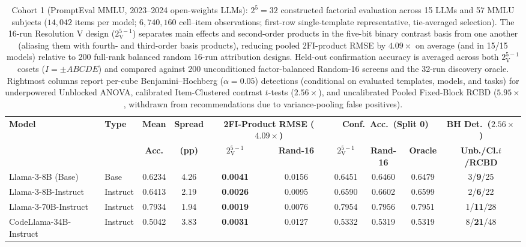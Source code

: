 \begin{table}[!ht]
\centering
\scriptsize
\setlength{\tabcolsep}{0.5pt}
\caption{Cohort 1 (PromptEval MMLU, 2023--2024 open-weights LLMs): $2^5=32$ constructed factorial evaluation across 15 LLMs and 57 MMLU subjects ($14{,}042$ items per model; $6{,}740{,}160$ cell--item observations; first-row single-template representative, tie-averaged selection). The 16-run Resolution V design ($2^{5-1}_{\mathrm{V}}$) separates main effects and second-order products in the five-bit binary contrast basis from one another (aliasing them with fourth- and third-order basis products), reducing pooled $2\mathrm{FI}$-product RMSE by $4.09\times$ on average (and in 15/15 models) relative to 200 full-rank balanced random 16-run attribution designs. Held-out confirmation accuracy is averaged across both $2^{5-1}_{\mathrm{V}}$ cosets ($I=\pm ABCDE$) and compared against 200 unconditioned factor-balanced Random-16 screens and the 32-run discovery oracle. Rightmost columns report per-cube Benjamini--Hochberg ($\alpha=0.05$) detections (conditional on evaluated templates, models, and tasks) for underpowered Unblocked ANOVA, calibrated Item-Clustered contrast $t$-tests (\textbf{$2.56\times$}), and uncalibrated Pooled Fixed-Block RCBD ($5.95\times$, withdrawn from recommendations due to variance-pooling false positives).}
\label{tab:mmlu_models}
\begin{tabular*}{\textwidth}{@{\extracolsep{\fill}}llcccccccc@{}}
\toprule
\textbf{Model} & \textbf{Type} & \textbf{Mean} & \textbf{Spread} & \multicolumn{2}{c}{\textbf{2FI-Product RMSE ($4.09\times$)}} & \multicolumn{3}{c}{\textbf{Conf.\ Acc.\ (Split 0)}} & \textbf{BH Det.\ ($2.56\times$)} \\
\cmidrule(lr){5-6} \cmidrule(lr){7-9}
 & & \textbf{Acc.} & \textbf{(pp)} & \textbf{$2^{5-1}_{\mathrm{V}}$} & \textbf{Rand-16} & \textbf{$2^{5-1}_{\mathrm{V}}$} & \textbf{Rand-16} & \textbf{Oracle} & \textbf{Unb./Cl.$t$/RCBD} \\
\midrule
Llama-3-8B (Base) & Base & 0.6234 & 4.26 & \textbf{0.0041} & 0.0156 & 0.6451 & 0.6460 & 0.6479 & 3/\textbf{9}/25 \\
Llama-3-8B-Instruct & Instruct & 0.6413 & 2.19 & \textbf{0.0026} & 0.0095 & 0.6590 & 0.6602 & 0.6599 & 2/\textbf{6}/22 \\
Llama-3-70B-Instruct & Instruct & 0.7934 & 1.94 & \textbf{0.0019} & 0.0076 & 0.7954 & 0.7956 & 0.7951 & 1/\textbf{11}/28 \\
CodeLlama-34B-Instruct & Instruct & 0.5042 & 3.83 & \textbf{0.0031} & 0.0127 & 0.5332 & 0.5319 & 0.5319 & 8/\textbf{21}/48 \\

\end{tabular*}
\end{table}
